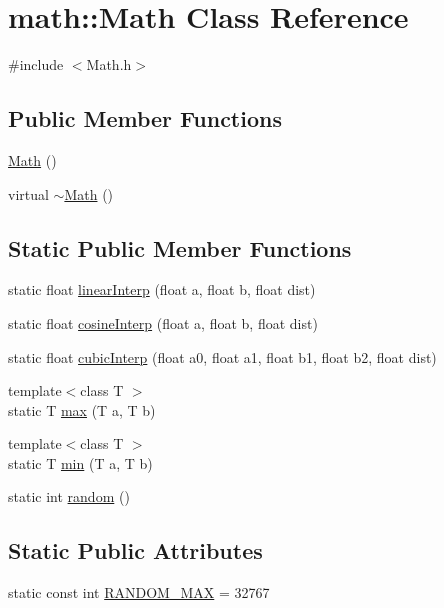 \hypertarget{classmath_1_1Math}{\section{math\-:\-:Math Class Reference}
\label{classmath_1_1Math}
}


{\ttfamily \#include $<$Math.\-h$>$}

\subsection*{Public Member Functions}
\begin{DoxyCompactItemize}
\item 
\hyperlink{classmath_1_1Math_a0baef779a970805b859ab68e97f13a9d}{Math} ()
\item 
virtual \hyperlink{classmath_1_1Math_a841546dc56f4aa88b380da2ba0211070}{$\sim$\-Math} ()
\end{DoxyCompactItemize}
\subsection*{Static Public Member Functions}
\begin{DoxyCompactItemize}
\item 
static float \hyperlink{classmath_1_1Math_a6d27f733861106075404b2e1fa2a0cd2}{linear\-Interp} (float a, float b, float dist)
\item 
static float \hyperlink{classmath_1_1Math_aea2ccc706b593ea4f1e8e34b79a3d59c}{cosine\-Interp} (float a, float b, float dist)
\item 
static float \hyperlink{classmath_1_1Math_a48ef0e0dbbcb7a863d2a55c033bdfb38}{cubic\-Interp} (float a0, float a1, float b1, float b2, float dist)
\item 
{\footnotesize template$<$class T $>$ }\\static T \hyperlink{classmath_1_1Math_a9522e7570de85f8293375be4b2eaeb20}{max} (T a, T b)
\item 
{\footnotesize template$<$class T $>$ }\\static T \hyperlink{classmath_1_1Math_a7e2b1287e5f20070c60e7ed536903662}{min} (T a, T b)
\item 
static int \hyperlink{classmath_1_1Math_ad8e0aaa8846dda2c7df09c999549b1f2}{random} ()
\end{DoxyCompactItemize}
\subsection*{Static Public Attributes}
\begin{DoxyCompactItemize}
\item 
static const int \hyperlink{classmath_1_1Math_a8b8007f82a1fd063ea5ce5dfacbc531e}{R\-A\-N\-D\-O\-M\-\_\-\-M\-A\-X} = 32767
\end{DoxyCompactItemize}


